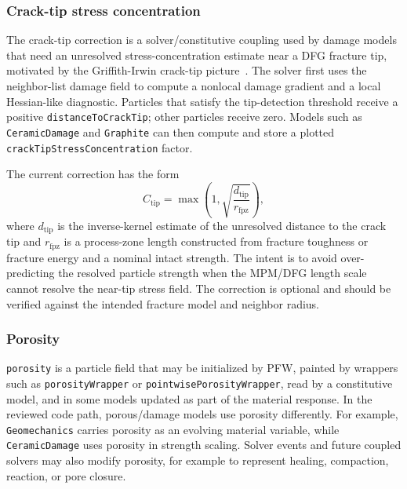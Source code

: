\subsubsection{Crack-tip stress concentration}
\label{subsubsec:crack-tip-stress-concentration}

The crack-tip correction is a solver/constitutive coupling used by damage models that need an unresolved stress-concentration estimate near a DFG fracture tip, motivated by the Griffith-Irwin crack-tip picture~\cite{griffith1921,irwin1957}.  The solver first uses the neighbor-list damage field to compute a nonlocal damage gradient and a local Hessian-like diagnostic.  Particles that satisfy the tip-detection threshold receive a positive \texttt{distanceToCrackTip}; other particles receive zero.  Models such as \texttt{CeramicDamage} and \texttt{Graphite} can then compute and store a plotted \texttt{crackTipStressConcentration} factor.

The current correction has the form
\begin{equation}
  C_{\mathrm{tip}}
  = \max\left(1,\sqrt{\frac{d_{\mathrm{tip}}}{r_{\mathrm{fpz}}}}\right),
  \label{eq:crack-tip-stress-concentration-outline}
\end{equation}
where \(d_{\mathrm{tip}}\) is the inverse-kernel estimate of the unresolved distance to the crack tip and \(r_{\mathrm{fpz}}\) is a process-zone length constructed from fracture toughness or fracture energy and a nominal intact strength.  The intent is to avoid over-predicting the resolved particle strength when the MPM/DFG length scale cannot resolve the near-tip stress field.  The correction is optional and should be verified against the intended fracture model and neighbor radius.

\subsubsection{Porosity}
\label{subsubsec:constitutive-porosity}

\texttt{porosity} is a particle field that may be initialized by PFW, painted by wrappers such as \texttt{porosityWrapper} or \texttt{pointwisePorosityWrapper}, read by a constitutive model, and in some models updated as part of the material response.  In the reviewed code path, porous/damage models use porosity differently.  For example, \texttt{Geomechanics} carries porosity as an evolving material variable, while \texttt{CeramicDamage} uses porosity in strength scaling.  Solver events and future coupled solvers may also modify porosity, for example to represent healing, compaction, reaction, or pore closure.


